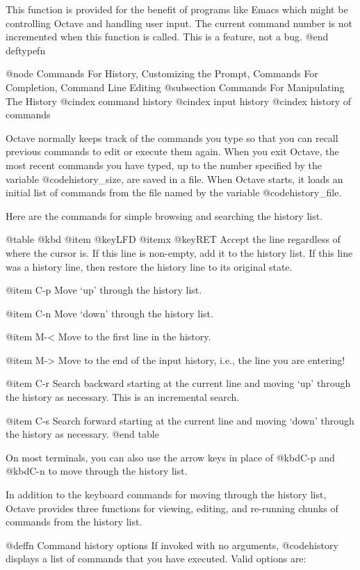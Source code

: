 This function is provided for the benefit of programs like Emacs which
might be controlling Octave and handling user input.  The current
command number is not incremented when this function is called.  This is
a feature, not a bug.
@end deftypefn

@node Commands For History, Customizing the Prompt, Commands For Completion, Command Line Editing
@subsection Commands For Manipulating The History
@cindex command history
@cindex input history
@cindex history of commands

Octave normally keeps track of the commands you type so that you can
recall previous commands to edit or execute them again.  When you exit
Octave, the most recent commands you have typed, up to the number
specified by the variable @code{history_size}, are saved in a file.
When Octave starts, it loads an initial list of commands from the file
named by the variable @code{history_file}.

Here are the commands for simple browsing and searching the history
list.

@table @kbd
@item @key{LFD}
@itemx @key{RET}
Accept the line regardless of where the cursor is.  If this line is
non-empty, add it to the history list.  If this line was a history
line, then restore the history line to its original state.

@item C-p
Move `up' through the history list.

@item C-n
Move `down' through the history list.

@item M-<
Move to the first line in the history.

@item M->
Move to the end of the input history, i.e., the line you are entering!

@item C-r
Search backward starting at the current line and moving `up' through
the history as necessary.  This is an incremental search.

@item C-s
Search forward starting at the current line and moving `down' through
the history as necessary.
@end table

On most terminals, you can also use the arrow keys in place of @kbd{C-p}
and @kbd{C-n} to move through the history list.

In addition to the keyboard commands for moving through the history
list, Octave provides three functions for viewing, editing, and
re-running chunks of commands from the history list.

@deffn {Command} history options
If invoked with no arguments, @code{history} displays a list of commands
that you have executed.  Valid options are:

